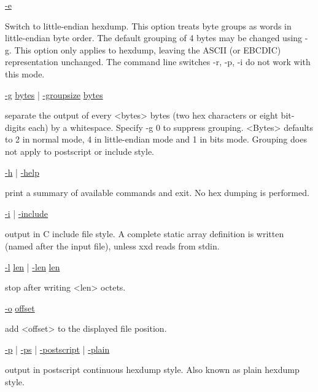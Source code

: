 \documentclass{ctexart}
\begin{document}
\begin{adjustwidth}{1cm}{0cm}
\noindent \underline{-e}
\begin{adjustwidth}{1cm}{0cm}
  Switch to little-endian hexdump.  This option treats byte groups as words in
  little-endian byte order.  The default grouping of 4 bytes may  be  changed
  using  -g.   This option only applies to hexdump, leaving the ASCII (or
  EBCDIC) representation unchanged.  The command line switches -r, -p, -i do not
  work with this mode.  \\
\end{adjustwidth}

\noindent \underline{-g} \underline{bytes} | \underline{-groupsize} \underline{bytes}
\begin{adjustwidth}{1cm}{0cm}
  separate  the  output  of  every <bytes> bytes (two hex characters or eight
  bit-digits each) by a whitespace.  Specify -g 0 to suppress grouping.  <Bytes>
  defaults to 2 in normal mode, 4 in little-endian mode and 1 in bits mode.
  Grouping does not apply to postscript or include style. \\
\end{adjustwidth}

\noindent \underline{-h} | \underline{-help}
\begin{adjustwidth}{1cm}{0cm}
  print a summary of available commands and exit.  No hex dumping is performed. \\
\end{adjustwidth}

\noindent \underline{-i} | \underline{-include}
\begin{adjustwidth}{1cm}{0cm}
  output in C include file style. A complete static array definition is written
  (named after the input file), unless xxd reads from stdin. \\
\end{adjustwidth}

\noindent \underline{-l} \underline{len} | \underline{-len} \underline{len}
\begin{adjustwidth}{1cm}{0cm}
              stop after writing <len> octets. \\
\end{adjustwidth}

\noindent \underline{-o} \underline{offset}
\begin{adjustwidth}{1cm}{0cm}
  add <offset> to the displayed file position. \\
\end{adjustwidth}

\noindent \underline{-p} | \underline{-ps} | \underline{-postscript} |
\underline{-plain}
\begin{adjustwidth}{1cm}{0cm}
  output in postscript continuous hexdump style. Also known as plain hexdump
  style. \\
\end{adjustwidth}


\end{adjustwidth}
\end{document}
